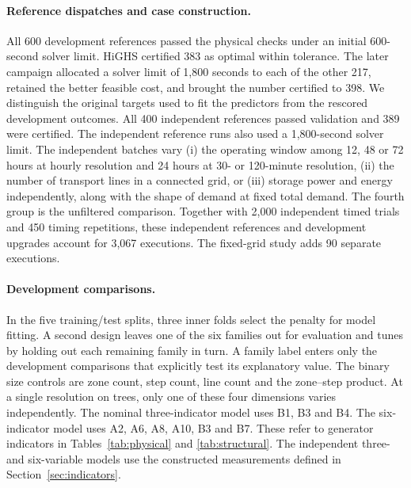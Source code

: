 \documentclass[11pt,a4paper]{article}
\begin{document}
\paragraph{Reference dispatches and case construction.}
All 600 development references passed the physical checks under an initial 600-second solver limit. HiGHS certified 383 as optimal within tolerance. The later campaign allocated a solver limit of 1,800 seconds to each of the other 217, retained the better feasible cost, and brought the number certified to 398. We distinguish the original targets used to fit the predictors from the rescored development outcomes. All 400 independent references passed validation and 389 were certified. The independent reference runs also used a 1,800-second solver limit. The independent batches vary (i) the operating window among 12, 48 or 72 hours at hourly resolution and 24 hours at 30- or 120-minute resolution, (ii) the number of transport lines in a connected grid, or (iii) storage power and energy independently, along with the shape of demand at fixed total demand. The fourth group is the unfiltered comparison. Together with 2,000 independent timed trials and 450 timing repetitions, these independent references and development upgrades account for 3,067 executions. The fixed-grid study adds 90 separate executions.

\paragraph{Development comparisons.}
In the five training/test splits, three inner folds select the penalty for model fitting. A second design leaves one of the six families out for evaluation and tunes by holding out each remaining family in turn. A family label enters only the development comparisons that explicitly test its explanatory value. The binary size controls are zone count, step count, line count and the zone--step product. At a single resolution on trees, only one of these four dimensions varies independently. The nominal three-indicator model uses B1, B3 and B4. The six-indicator model uses A2, A6, A8, A10, B3 and B7. These refer to generator indicators in Tables~\ref{tab:physical} and \ref{tab:structural}. The independent three- and six-variable models use the constructed measurements defined in Section~\ref{sec:indicators}.
\end{document}
